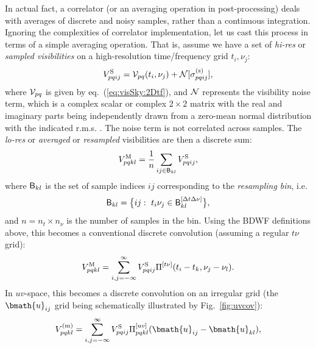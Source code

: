 \documentclass[useAMS,usenatbib]{mn2e}
\begin{document}
In actual fact, a correlator (or an averaging operation in post-processing) deals with averages of discrete and noisy
samples, rather than a continuous integration. Ignoring the complexities of correlator implementation, let us cast
this process in terms of a simple averaging operation. That is, assume we have a set of \emph{hi-res} or
\emph{sampled visibilities} on a high-resolution time/frequency grid
$t_i,\nu_j$:
\begin{equation}
\label{eq:sampling}
V^\mathrm{S}_{pqij} = \mathcal{V}_{pq}(t_i,\nu_j) + \mathcal{N}[\sigma^\mathrm{(s)}_{pqij}],
\end{equation}
where $\mathcal{V}_{pq}$ is given by eq.~(\ref{eq:visSky:2Dtf}), and $\mathcal{N}$ represents the visibility noise term, which is
a complex scalar or complex $2\times2$ matrix with the real and imaginary parts being independently drawn from a 
zero-mean normal distribution with the indicated r.m.s. \citep{wrobel1999sensitivity}. The noise
term is not correlated across samples.
The \emph{lo-res} or \emph{averaged} or \emph{resampled} visibilities are then a discrete sum:
\begin{equation}
\label{eq:discrete:tf0}
V^\mathrm{M}_{pqkl} = \frac{1}{n} \sum_{ij\in\mathsf{B}_{kl}}  V^\mathrm{S}_{pqij},
\end{equation}
where $\mathsf{B}_{kl}$ is the set of sample indices $ij$ corresponding to the \emph{resampling bin}, i.e.
\begin{equation}
\mathsf{B}_{kl} = \big \{ ij:~t_i\nu_j \in \mathsf{B}^{[\Delta t\Delta\nu]}_{kl} \big \},
\end{equation}
and $n = n_t\times n_\nu$ is the number of samples in the bin. 
Using the BDWF definitions above, this becomes a conventional discrete convolution (assuming a regular 
$t\nu$ grid):
\begin{equation}
\label{eq:discrete:tf}
V^\mathrm{M}_{pqkl} = \sum_{i,j=-\infty}^{\infty}  V^\mathrm{S}_{pqij} \Pi^{[t\nu]}(t_i-t_k,\nu_j-\nu_l).
\end{equation}
In $uv$-space, this becomes a discrete convolution on an irregular grid (the $\bmath{u}_{ij}$ grid being schematically illustrated by Fig.~\ref{fig:uvcov}):
\begin{equation}
\label{eq:discrete:uv}
V^\mathrm{(m)}_{pqkl} = \sum_{i,j=-\infty}^{\infty}  \Vs_{pqij} \Puv_{pqkl}(\bmath{u}_{ij}-\bmath{u}_{kl}),
\end{equation}
\end{document}
